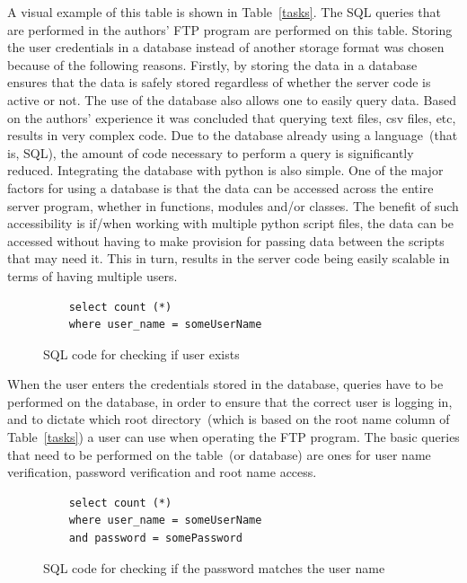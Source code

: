 \documentclass[journal, a4paper]{IEEEtran}
\begin{document}
A visual example of this table is shown in Table~\ref{tasks}. The SQL queries that are performed in the authors' FTP  program are performed on this table. Storing the user credentials in a database instead of another storage format was chosen because of the following reasons. Firstly, by storing the data in a database ensures that the data is safely stored regardless of whether the server code is active or not. The use of the database also allows one to easily query data. Based on the authors' experience it was concluded that querying text files, csv files, etc, results in very complex code. Due to the database already using a language~(that is, SQL), the amount of code necessary to perform a query is significantly reduced. Integrating the database with python is also simple. One of the major factors for using a database is that the data can be accessed across the entire server program, whether in functions, modules and/or classes. The benefit of such accessibility is if/when working with multiple python script files, the data can be accessed without having to make provision for passing data between the scripts that may need it. This in turn, results in the server code being easily scalable in terms of having multiple users.






\begin{figure}[hbtp]
	\begin{lstlisting}
	select count (*) 
	where user_name = someUserName
	\end{lstlisting}
	\caption{SQL code for checking if user exists}
	\label {sqluser}
\end{figure}

When the user enters the credentials stored in the database,  queries have to be performed on the database, in order to ensure that the correct user is logging in, and to dictate which root directory~(which is based on the root name column of Table~\ref{tasks}) a user can use when operating the FTP program. The basic queries that need to be performed on the table~(or database) are ones for user name verification, password verification and root name access.

\begin{figure}[hbtp]
	\begin{lstlisting}
	select count (*) 
	where user_name = someUserName
	and password = somePassword
	\end{lstlisting}
	\caption{SQL code for checking if the password matches the user name}
	\label {sqlpass}
\end{figure}
\end{document}

